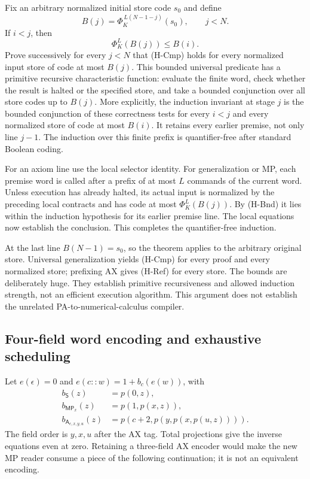 Fix an arbitrary normalized initial store code $s_0$ and define
\[
 B(j)=\Phi_K^{\,L(N-1-j)}(s_0),\qquad j<N.
\]
If $i<j$, then
\[
                  \Phi_K^L(B(j))\le B(i).                 \tag{H-Bnd}
\]
Prove successively for every $j<N$ that (H-Cmp) holds for every
normalized input store of code at most $B(j)$. This bounded
universal predicate has a primitive recursive characteristic
function: evaluate the finite word, check whether the result is
halted or the specified store, and take a bounded conjunction over
all store codes up to $B(j)$. More explicitly, the induction invariant
at stage $j$ is the bounded conjunction of these correctness tests for
every $i<j$ and every normalized store of code at most $B(i)$.
It retains every earlier premise, not only line $j-1$. The induction
over this finite prefix is quantifier-free after standard Boolean
coding.

For an axiom line use the local selector identity. For
generalization or MP, each premise word is called after a prefix
of at most $L$ commands of the current word. Unless execution
has already halted, its actual input is normalized by the preceding
local contracts and has code at most $\Phi_K^L(B(j))$. By (H-Bnd)
it lies within the induction hypothesis for its earlier premise
line. The local equations now establish the conclusion. This
completes the quantifier-free induction.

At the last line $B(N-1)=s_0$, so the theorem applies to the
arbitrary original store. Universal generalization yields
(H-Cmp) for every proof and every normalized store; prefixing AX
gives (H-Ref) for every store. The bounds are deliberately huge.
They establish primitive recursiveness and allowed induction
strength, not an efficient execution algorithm. This argument
does not establish the unrelated PA-to-numerical-calculus compiler.

\subsection{Four-field word encoding and exhaustive scheduling}

Let $e(\epsilon)=0$ and $e(c::w)=1+b_c(e(w))$, with
\begin{align*}
 b_{\mathsf S}(z)&=p(0,z),\\
 b_{\mathsf{MP}_x}(z)&=p(1,p(x,z)),\\
 b_{\mathsf A_{c,x,y,u}}(z)&=p(c+2,p(y,p(x,p(u,z)))).       \tag{H-Enc}
\end{align*}
The field order is $y,x,u$ after the AX tag. Total projections
give the inverse equations even at zero. Retaining a three-field
AX encoder would make the new MP reader consume a piece of the
following continuation; it is not an equivalent encoding.

